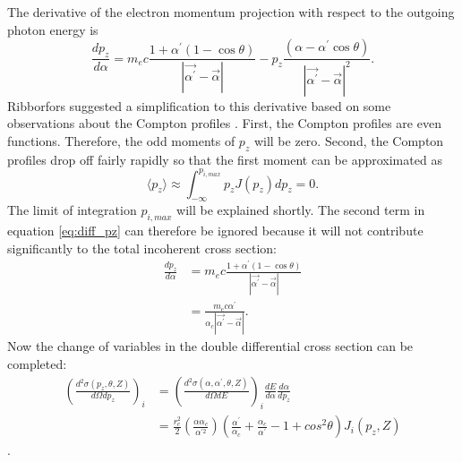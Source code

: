 The derivative of the electron momentum projection with respect to the outgoing 
photon energy is 
\begin{equation}
  \frac{dp_z}{d\alpha} = m_ec \frac{1 + \alpha^{'}(1-\cos{\theta})}
  {\left|\vec{\alpha^{'}} - \vec{\alpha} \right|} - 
  p_z \frac{\left(\alpha - \alpha^{'}\cos{\theta} \right)}
  {\left|\vec{\alpha^{'}} - \vec{\alpha} \right|^2}.
  \label{eq:diff_pz}
\end{equation}
Ribborfors suggested a simplification to this derivative based on some 
observations about the Compton profiles \citep{ribberfors_x-ray_1983}. First, 
the Compton profiles are even functions. Therefore, the odd moments of $p_z$ 
will be zero. Second, the Compton profiles drop off fairly rapidly so that
the first moment can be approximated as 
\begin{equation}
  \langle p_z \rangle \approx \int_{-\infty}^{p_{i,max}} p_z J(p_z)dp_z = 0.
\end{equation}
The limit of integration $p_{i,max}$ will be explained shortly.
The second term in equation \ref{eq:diff_pz} can therefore be ignored because
it will not contribute significantly to the total incoherent cross section:
\begin{align}
  \frac{dp_z}{d\alpha} & = m_ec \frac{1 + \alpha^{'}(1-\cos{\theta})}
  {\left|\vec{\alpha^{'}} - \vec{\alpha} \right|} \nonumber \\
  & = \frac{m_ec \alpha^{'}}
  {\alpha_c \left|\vec{\alpha^{'}} - \vec{\alpha} \right|}.
  \label{eq:diff_pz_simp}
\end{align}
Now the change of variables in the double differential cross section can be
completed: 
\begin{align}
  \left(\frac{d^2\sigma(p_z,\theta,Z)}{d\Omega dp_z}\right)_i & = 
  \left(\frac{d^2\sigma(\alpha,\alpha^{'},\theta,Z)}{d\Omega dE}\right)_i 
  \frac{dE}{d\alpha}
  \frac{d\alpha}{dp_z} \nonumber \\ 
  & =  \frac{r_e^2}{2} \left(\frac{\alpha\alpha_c}{\alpha^{'2}}\right) 
  \left(\frac{\alpha^{'}}{\alpha_c} + \frac{\alpha_c}{\alpha^{'}} - 1 + 
  cos^2\theta \right) J_i(p_z,Z)
\end{align}
\citep{ribberfors_x-ray_1983}.

